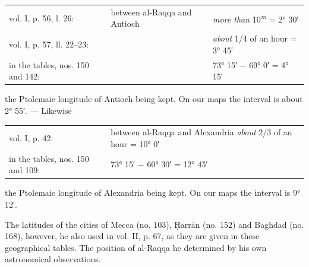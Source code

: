 \documentclass[11pt]{article}
\begin{document}
\begin{center}\small\begin{tabular}{lll}
vol. I, p. 56, l. 26: & between al-Raqqa and Antioch & \emph{more than} 10\textsuperscript{\itshape m} = 2° 30′ \\
vol. I, p. 57, ll. 22–23: &  & \emph{about} 1/4 of an hour = 3° 45′ \\
in the tables, nos. 150 and 142: &  & 73° 15′ − 69° 0′ = 4° 15′ \\
\end{tabular}\end{center}
\par the Ptolemaic longitude of Antioch being kept. On our maps the interval is about 2° 55′. — Likewise\par
\begin{center}\small\begin{tabular}{ll}
vol. I, p. 42: & between al-Raqqa and Alexandria \emph{about} 2/3 of an hour = 10° 0′ \\
in the tables, nos. 150 and 109: & 73° 15′ − 60° 30′ = 12° 45′ \\
\end{tabular}\end{center}
\par the Ptolemaic longitude of Alexandria being kept. On our maps the interval is 9° 12′.\par
\par The latitudes of the cities of Mecca (no. 103), Ḥarrān (no. 152) and Baghdad (no. 168), however, he also used in vol. II, p. 67, as they are given in these geographical tables. The position of al-Raqqa he determined by his own astronomical observations.\par
\end{document}
